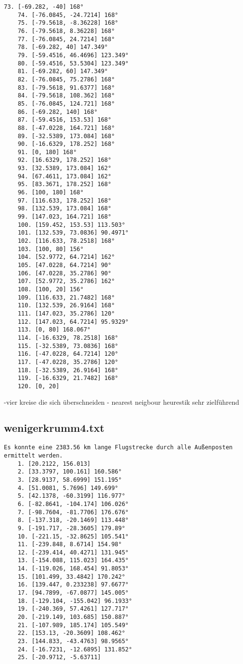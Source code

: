 \documentclass[a4paper,10pt,ngerman]{scrartcl}
\begin{document}
\begin{lstlisting}[frame=single, title=Programmausgabe wenigerkrumm3.txt, breaklines=true,label={lst:lstlisting4}]
    73. [-69.282, -40] 168°
    74. [-76.0845, -24.7214] 168°
    75. [-79.5618, -8.36228] 168°
    76. [-79.5618, 8.36228] 168°
    77. [-76.0845, 24.7214] 168°
    78. [-69.282, 40] 147.349°
    79. [-59.4516, 46.4696] 123.349°
    80. [-59.4516, 53.5304] 123.349°
    81. [-69.282, 60] 147.349°
    82. [-76.0845, 75.2786] 168°
    83. [-79.5618, 91.6377] 168°
    84. [-79.5618, 108.362] 168°
    85. [-76.0845, 124.721] 168°
    86. [-69.282, 140] 168°
    87. [-59.4516, 153.53] 168°
    88. [-47.0228, 164.721] 168°
    89. [-32.5389, 173.084] 168°
    90. [-16.6329, 178.252] 168°
    91. [0, 180] 168°
    92. [16.6329, 178.252] 168°
    93. [32.5389, 173.084] 162°
    94. [67.4611, 173.084] 162°
    95. [83.3671, 178.252] 168°
    96. [100, 180] 168°
    97. [116.633, 178.252] 168°
    98. [132.539, 173.084] 168°
    99. [147.023, 164.721] 168°
    100. [159.452, 153.53] 113.503°
    101. [132.539, 73.0836] 90.4971°
    102. [116.633, 78.2518] 168°
    103. [100, 80] 156°
    104. [52.9772, 64.7214] 162°
    105. [47.0228, 64.7214] 90°
    106. [47.0228, 35.2786] 90°
    107. [52.9772, 35.2786] 162°
    108. [100, 20] 156°
    109. [116.633, 21.7482] 168°
    110. [132.539, 26.9164] 168°
    111. [147.023, 35.2786] 120°
    112. [147.023, 64.7214] 95.9329°
    113. [0, 80] 168.067°
    114. [-16.6329, 78.2518] 168°
    115. [-32.5389, 73.0836] 168°
    116. [-47.0228, 64.7214] 120°
    117. [-47.0228, 35.2786] 120°
    118. [-32.5389, 26.9164] 168°
    119. [-16.6329, 21.7482] 168°
    120. [0, 20]
    \end{lstlisting}

    -vier kreise die sich überschneiden
    - nearest neigbour heurestik sehr zielführend

    \subsection{wenigerkrumm4.txt}\label{subsec:wenigerkrumm4.txt}

    \begin{lstlisting}[frame=single, title=Programmausgabe wenigerkrumm4.txt, breaklines=true,label={lst:lstlisting4}]
    Es konnte eine 2383.56 km lange Flugstrecke durch alle Außenposten ermittelt werden.
    1. [20.2122, 156.013]
    2. [33.3797, 100.161] 160.586°
    3. [28.9137, 58.6999] 151.195°
    4. [51.0081, 5.7696] 149.699°
    5. [42.1378, -60.3199] 116.977°
    6. [-82.8641, -104.174] 106.026°
    7. [-98.7604, -81.7706] 176.676°
    8. [-137.318, -20.1469] 113.448°
    9. [-191.717, -28.3605] 179.89°
    10. [-221.15, -32.8625] 105.541°
    11. [-239.848, 8.6714] 154.98°
    12. [-239.414, 40.4271] 131.945°
    13. [-154.088, 115.023] 164.435°
    14. [-119.026, 168.454] 91.8053°
    15. [101.499, 33.4842] 170.242°
    16. [139.447, 0.233238] 97.6677°
    17. [94.7899, -67.0877] 145.005°
    18. [-129.104, -155.042] 96.1933°
    19. [-240.369, 57.4261] 127.717°
    20. [-219.149, 103.685] 150.887°
    21. [-107.989, 185.174] 105.549°
    22. [153.13, -20.3609] 108.462°
    23. [144.833, -43.4763] 98.9565°
    24. [-16.7231, -12.6895] 131.852°
    25. [-20.9712, -5.63711]
    \end{lstlisting}
\end{document}
